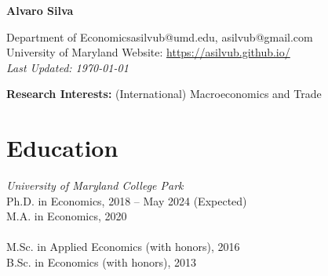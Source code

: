 \documentclass[10pt]{article}
\begin{document}
\begin{center}
\begin{Large} \bfseries Alvaro Silva\end{Large}
\end{center}


\vspace*{0.2in}
\noindent Department of Economics\hfill asilvub@umd.edu, asilvub@gmail.com \\
University of Maryland \hfill Website: \href{https://asilvub.github.io/}{https://asilvub.github.io/} \\
\hfill \emph{Last Updated: \today}\\

\vspace*{-0.1in}


\noindent \textbf{\normalsize Research Interests: } (International) Macroeconomics and Trade

\section*{Education}
{\itshape University of Maryland College Park}\\
\indent Ph.D. in Economics, 2018 --  May 2024 (Expected)\\
\indent M.A. in Economics, 2020 \\[-0.1in]

\\
\indent M.Sc. in Applied Economics (with honors), 2016 \\
\indent B.Sc. in Economics (with honors), 2013

\end{document}
